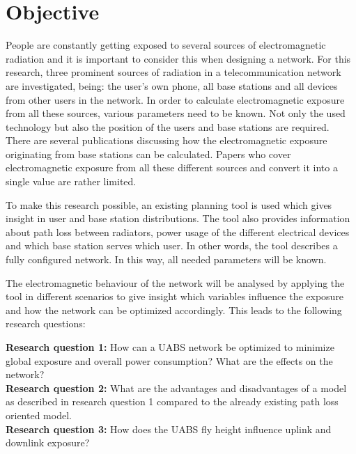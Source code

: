 \section{Objective}
\label{sec:objective}
People are constantly getting exposed to several sources of electromagnetic radiation and it is important to consider this when designing a network. For this research, three prominent sources of radiation in a telecommunication
network are investigated, being: the user's own phone, all base stations and all devices from other users in the network. In order to calculate electromagnetic 
exposure from all these sources, various parameters need to be known. Not only the used technology but also the position of the users and base stations 
are required. There are several publications discussing how the electromagnetic exposure originating from base stations can be calculated. 
Papers who cover electromagnetic exposure from all these different sources and convert it into a single value are rather limited.

To make this research possible, an existing planning tool is used which gives insight in user and base station distributions.
The tool also provides information about path loss between radiators, power usage of the different electrical devices and which base station serves which user. In other words, the tool describes 
a fully configured network.
In this way, all needed parameters will be known.

The electromagnetic behaviour of the network will be analysed by applying the tool in different scenarios to give insight which variables influence the exposure and how
the network can be optimized accordingly. 
This leads to the following research questions:

\textbf{Research question 1:} How can a \gls{UABS} network be optimized to minimize global exposure and overall power consumption? What are the effects on the network?\\

\textbf{Research question 2:} What are the advantages and disadvantages of a model as described in research question 1 compared to the already existing path loss oriented model.\\

\textbf{Research question 3:} How does the \gls{UABS} fly height influence uplink and downlink exposure?

